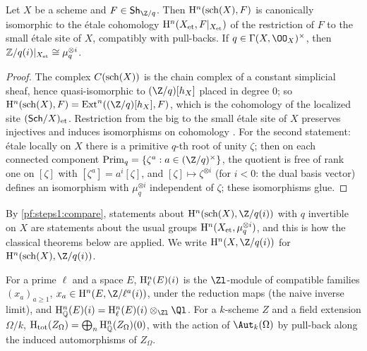 \begin{lemma}\label{pf:steps1:compare}
Let $X$ be a scheme and $F\in\stepsISh_{\Z/q}$. Then $\mathrm{H}^n(\mathrm{sch}(X),F)$ is canonically
isomorphic to the \'etale cohomology $\mathrm{H}^n(X_{\mathrm{et}},F|_{X_{\mathrm{et}}})$ of the
restriction of $F$ to the small \'etale site of $X$, compatibly with pull-backs. If
$q\in\Gamma(X,\OO_X)^\times$, then $\mathbb{Z}/q(i)|_{X_{\mathrm{et}}}\cong\mu_q^{\otimes i}$.
\end{lemma}

\begin{proof}
The complex $C(\mathrm{sch}(X))$ is the chain complex of a constant simplicial sheaf, hence
quasi-isomorphic to $(\Z/q)[h_X]$ placed in degree $0$; so $\stepsIH^n(\stepsIsch(X),F)
=\mathrm{Ext}^n((\Z/q)[h_X],F)$, which is the cohomology of the localized site
$(\mathsf{Sch}/X)_{\mathrm{et}}$. Restriction from the big to the small \'etale site of $X$ preserves
injectives and induces isomorphisms on cohomology \cite[Tag~0757, Lemma~0758]{Stacks2024}. For the
second statement: \'etale locally on $X$ there is a primitive $q$-th root of unity $\zeta$; then on each
connected component $\mathrm{Prim}_q=\{\zeta^a:a\in(\Z/q)^\times\}$, the quotient is free of rank one on
$[\zeta]$ with $[\zeta^a]=a^i[\zeta]$, and $[\zeta]\mapsto\zeta^{\otimes i}$ (for $i<0$: the dual basis
vector) defines an isomorphism with $\mu_q^{\otimes i}$ independent of $\zeta$; these isomorphisms glue.
\end{proof}

By \cref{pf:steps1:compare}, statements about $\stepsIH^n(\stepsIsch(X),\Z/q(i))$ with $q$
invertible on $X$ are statements about the usual groups $\mathrm{H}^n(X_{\mathrm{et}},\mu_q^{\otimes i})$,
and this is how the classical theorems below are applied. We write $\stepsIH^n(X,\Z/q(i))$ for
$\stepsIH^n(\stepsIsch(X),\Z/q(i))$.

\begin{definition}\label{pf:steps1:def:ladic}
For a prime $\ell$ and a space $E$, $\mathrm{H}_{\ell}^n(E)(i)$ is the $\Zl$-module of compatible families
$(x_a)_{a\ge1}$, $x_a\in\stepsIH^n(E,\Z/\ell^a(i))$, under the reduction maps (the naive inverse
limit), and $\stepsIHQ^n(E)(i)=\stepsIHl^n(E)(i)\otimes_{\Zl}\Ql$. For a $k$-scheme $Z$ and a field
extension $\Omega/k$, $\mathrm{H}_{\mathrm{tot}}(Z_\Omega)=\bigoplus_n\mathrm{H}_{\mathbb{Q}}^n(Z_\Omega)(0)$, with the action of
$\Aut_k(\Omega)$ by pull-back along the induced automorphisms of $Z_\Omega$.
 
\end{definition}

